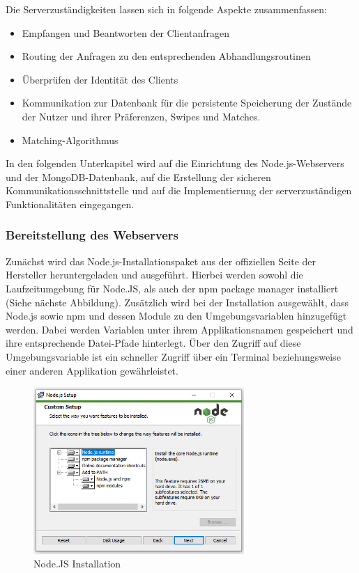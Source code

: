 Die Serverzuständigkeiten lassen sich in folgende Aspekte zusammenfassen:
\begin{itemize}
\item Empfangen und Beantworten der Clientanfragen
\item Routing der Anfragen zu den entsprechenden Abhandlungsroutinen
\item Überprüfen der Identität des Clients
\item Kommunikation zur Datenbank für die persistente Speicherung der Zustände der Nutzer und ihrer Präferenzen, Swipes und Matches.
\item Matching-Algorithmus
\end{itemize} 

\noindent
In den folgenden Unterkapitel wird auf die Einrichtung des Node.js-Webservers und der MongoDB-Datenbank, auf die Erstellung der sicheren Kommunikationsschnittstelle und auf die Implementierung der serverzuständigen Funktionalitäten eingegangen.

\subsubsection{Bereitstellung des Webservers}
Zunächst wird das Node.js-Installationspaket aus der offiziellen Seite der Hersteller heruntergeladen und ausgeführt. Hierbei werden sowohl die Laufzeitumgebung für Node.JS, als auch der npm package manager installiert (Siehe nächste Abbildung). 
Zusätzlich wird bei der Installation ausgewählt, dass Node.js sowie npm und dessen Module zu den Umgebungsvariablen hinzugefügt werden. Dabei werden Variablen unter ihrem Applikationsnamen gespeichert und ihre entsprechende Datei-Pfade hinterlegt.
Über den Zugriff auf diese Umgebungsvariable ist ein schneller Zugriff über ein Terminal beziehungsweise einer anderen Applikation gewährleistet.


\begin{figure}[h]
\centering
\includegraphics[width=8cm]{images/nodejs_install.png}
\caption{Node.JS Installation}
\end{figure}

